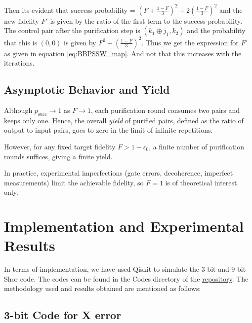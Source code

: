 \documentclass[conference]{IEEEtran}
\begin{document}
Then its evident that success probability = $(F + \frac{1-F}{3})^2 + 2(\frac{1-F}{3})^2$ and the new fidelity $F'$ is given by the ratio of the first term to the success probability. The control pair after the purification step is $(k_1 \oplus j_1, k_2)$ and the probability that this is $(0,0)$ is given by $F^2 + (\frac{1-F}{3})^2$. Thus we get the expression for $F'$ as given in equation \ref{eq:BBPSSW_map}. And not that this increases with the iterations.

\subsection{Asymptotic Behavior and Yield}

Although $p_{\text{succ}}\to1$ as $F\to1$, 
each purification round consumes two pairs and keeps only one.
Hence, the overall \emph{yield} of purified pairs,
defined as the ratio of output to input pairs, goes to zero in the limit
of infinite repetitions.

However, for any fixed target fidelity $F>1-\epsilon_0$,
a finite number of purification rounds suffices, giving a finite yield.

In practice, experimental imperfections (gate errors, decoherence, 
imperfect measurements) limit the achievable fidelity, so $F=1$
is of theoretical interest only.

\section{Implementation and Experimental Results}
In terms of implementation, we have used Qiskit to simulate the 3-bit and 9-bit Shor code. The codes can be found in the Codes directory of the \href{https://github.com/jaymehta132/QuantumErrorCorrection-EE7001}{repository}. The methodology used and results obtained are mentioned as follows: 
\subsection{3-bit Code for X error}
\end{document}
